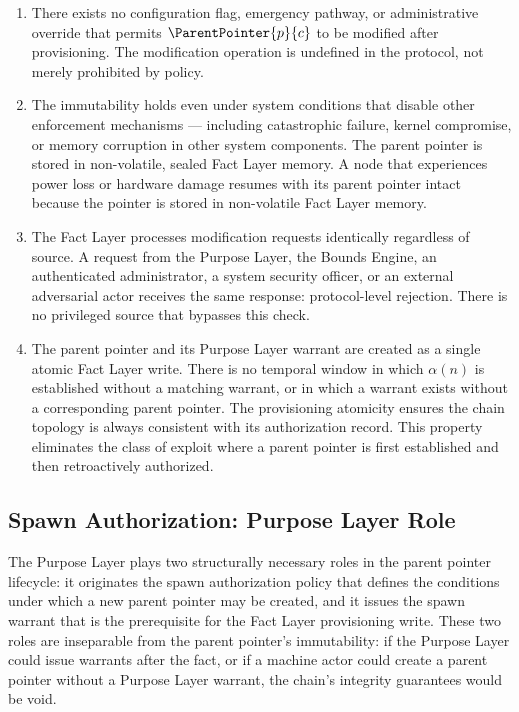 \begin{enumerate}
    \item[(I1) \textbf{No override path for any actor}] There exists no configuration flag, emergency pathway, or administrative override that permits $\ParentPointer{p}{c}$ to be modified after provisioning. The modification operation is undefined in the protocol, not merely prohibited by policy.

    \item[(I2) \textbf{Holds under all failure conditions}] The immutability holds even under system conditions that disable other enforcement mechanisms --- including catastrophic failure, kernel compromise, or memory corruption in other system components. The parent pointer is stored in non-volatile, sealed Fact Layer memory. A node that experiences power loss or hardware damage resumes with its parent pointer intact because the pointer is stored in non-volatile Fact Layer memory.

    \item[(I3) \textbf{Equivalent treatment of all sources}] The Fact Layer processes modification requests identically regardless of source. A request from the Purpose Layer, the Bounds Engine, an authenticated administrator, a system security officer, or an external adversarial actor receives the same response: protocol-level rejection. There is no privileged source that bypasses this check.

    \item[(I4) \textbf{Atomic warrant-pointer creation}] The parent pointer and its Purpose Layer warrant are created as a single atomic Fact Layer write. There is no temporal window in which $\alpha(n)$ is established without a matching warrant, or in which a warrant exists without a corresponding parent pointer. The provisioning atomicity ensures the chain topology is always consistent with its authorization record. This property eliminates the class of exploit where a parent pointer is first established and then retroactively authorized.
\end{enumerate}

\subsection{Spawn Authorization: Purpose Layer Role}
\label{sec:purpose-layer-authorization}

The Purpose Layer plays two structurally necessary roles in the parent pointer lifecycle: it originates the spawn authorization policy that defines the conditions under which a new parent pointer may be created, and it issues the spawn warrant that is the prerequisite for the Fact Layer provisioning write. These two roles are inseparable from the parent pointer's immutability: if the Purpose Layer could issue warrants after the fact, or if a machine actor could create a parent pointer without a Purpose Layer warrant, the chain's integrity guarantees would be void.

